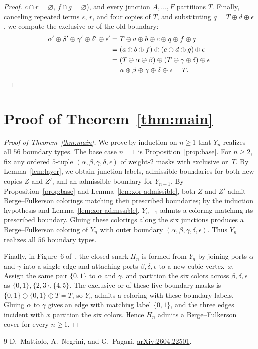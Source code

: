 \documentclass[11pt]{article}
\begin{document}
\begin{proof}
$c \cap r = \varnothing$, $f \cap g = \varnothing$), and every junction $A,\dots,F$
partitions $T$. Finally, canceling repeated terms $s$, $r$, and four copies of $T$, and
substituting $q = T \oplus d \oplus \epsilon$, we compute the exclusive or of the old
boundary:
\begin{align*}
  \alpha' \oplus \beta' \oplus \gamma' \oplus \delta' \oplus \epsilon'
  &= T \oplus a \oplus b \oplus c \oplus q \oplus f \oplus g \\
  &= (a \oplus b \oplus f) \oplus (c \oplus d \oplus g) \oplus \epsilon \\
  &= (T \oplus \alpha \oplus \beta) \oplus (T \oplus \gamma \oplus \delta) \oplus \epsilon \\
  &= \alpha \oplus \beta \oplus \gamma \oplus \delta \oplus \epsilon = T. \qedhere
\end{align*}
\end{proof}

\section{Proof of Theorem~\texorpdfstring{\ref{thm:main}}{1}}

\begin{proof}[Proof of Theorem~\ref{thm:main}]
We prove by induction on $n \ge 1$ that $Y_n$ realizes all $56$ boundary types. The base
case $n = 1$ is Proposition~\ref{prop:base}. For $n \ge 2$, fix any ordered $5$-tuple
$(\alpha,\beta,\gamma,\delta,\epsilon)$ of weight-$2$ masks with exclusive or~$T$. By
Lemma~\ref{lem:layer}, we obtain junction labels, admissible boundaries for both new
copies $Z$ and $Z'$, and an admissible boundary for $Y_{n-1}$. By
Proposition~\ref{prop:base} and Lemma~\ref{lem:xor-admissible}, both $Z$ and $Z'$ admit
Berge--Fulkerson colorings matching their prescribed boundaries; by the induction
hypothesis and Lemma~\ref{lem:xor-admissible}, $Y_{n-1}$ admits a coloring matching its
prescribed boundary. Gluing these colorings along the six junctions produces a
Berge--Fulkerson coloring of $Y_n$ with outer boundary
$(\alpha,\beta,\gamma,\delta,\epsilon)$. Thus $Y_n$ realizes all $56$ boundary types.

Finally, in Figure~6 of~\cite{MNP}, the closed snark $H_n$ is formed from $Y_n$ by
joining ports $\alpha$ and $\gamma$ into a single edge and attaching ports
$\beta, \delta, \epsilon$ to a new cubic vertex~$x$. Assign the same pair $\{0,1\}$ to
$\alpha$ and $\gamma$, and partition the six colors across $\beta, \delta, \epsilon$ as
$\{0,1\}, \{2,3\}, \{4,5\}$. The exclusive or of these five boundary masks is
$\{0,1\} \oplus \{0,1\} \oplus T = T$, so $Y_n$ admits a coloring with these boundary
labels. Gluing $\alpha$ to $\gamma$ gives an edge with matching label $\{0,1\}$, and the
three edges incident with $x$ partition the six colors. Hence $H_n$ admits a
Berge--Fulkerson cover for every $n \ge 1$.
\end{proof}

\begin{thebibliography}{9}
D.~Mattiolo, A.~Negrini, and G.~Pagani,
\href{https://arxiv.org/abs/2604.22501}{arXiv:2604.22501}.
\end{thebibliography}
\end{document}
